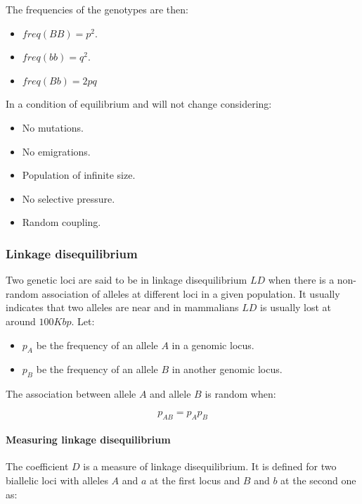 			The frequencies of the genotypes are then:

			\begin{multicols}{3}
				\begin{itemize}
					\item $freq(BB) = p^2$.
					\item $freq(bb) = q^2$.
					\item $freq(Bb) = 2pq$
				\end{itemize}
			\end{multicols}

			In a condition of equilibrium and will not change considering:

			\begin{multicols}{3}
				\begin{itemize}
					\item No mutations.
					\item No emigrations.
					\item Population of infinite size.
					\item No selective pressure.
					\item Random coupling.
				\end{itemize}
			\end{multicols}

		\subsubsection{Linkage disequilibrium}
		Two genetic loci are said to be in linkage disequilibrium $LD$ when there is a non-random association of alleles at different loci in a given population.
		It usually indicates that two alleles are near and in mammalians $LD$ is usually lost at around $100Kbp$.
		Let:

		\begin{multicols}{2}
			\begin{itemize}
				\item $p_A$ be the frequency of an allele $A$ in a genomic locus.
				\item $p_B$ be the frequency of an allele $B$ in another genomic locus.
			\end{itemize}
		\end{multicols}

		The association between allele $A$ and allele $B$ is random when:

		$$p_{AB} = p_Ap_B$$

			\paragraph{Measuring linkage disequilibrium}
			The coefficient $D$ is a measure of linkage disequilibrium.
			It is defined for two biallelic loci with alleles $A$ and $a$ at the first locus and $B$ and $b$ at the second one as:

